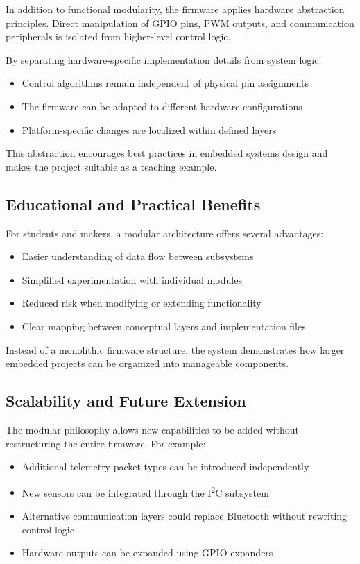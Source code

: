 In addition to functional modularity, the firmware applies hardware abstraction principles. Direct manipulation of GPIO pins, PWM outputs, and communication peripherals is isolated from higher-level control logic.

By separating hardware-specific implementation details from system logic:

\begin{itemize}
	\item Control algorithms remain independent of physical pin assignments
	\item The firmware can be adapted to different hardware configurations
	\item Platform-specific changes are localized within defined layers
\end{itemize}

This abstraction encourages best practices in embedded systems design and makes the project suitable as a teaching example.

\subsection{Educational and Practical Benefits}

For students and makers, a modular architecture offers several advantages:

\begin{itemize}
	\item Easier understanding of data flow between subsystems
	\item Simplified experimentation with individual modules
	\item Reduced risk when modifying or extending functionality
	\item Clear mapping between conceptual layers and implementation files
\end{itemize}

Instead of a monolithic firmware structure, the system demonstrates how larger embedded projects can be organized into manageable components.

\subsection{Scalability and Future Extension}

The modular philosophy allows new capabilities to be added without restructuring the entire firmware. For example:

\begin{itemize}
	\item Additional telemetry packet types can be introduced independently
	\item New sensors can be integrated through the I\textsuperscript{2}C subsystem
	\item Alternative communication layers could replace Bluetooth without rewriting control logic
	\item Hardware outputs can be expanded using GPIO expanders
\end{itemize}


